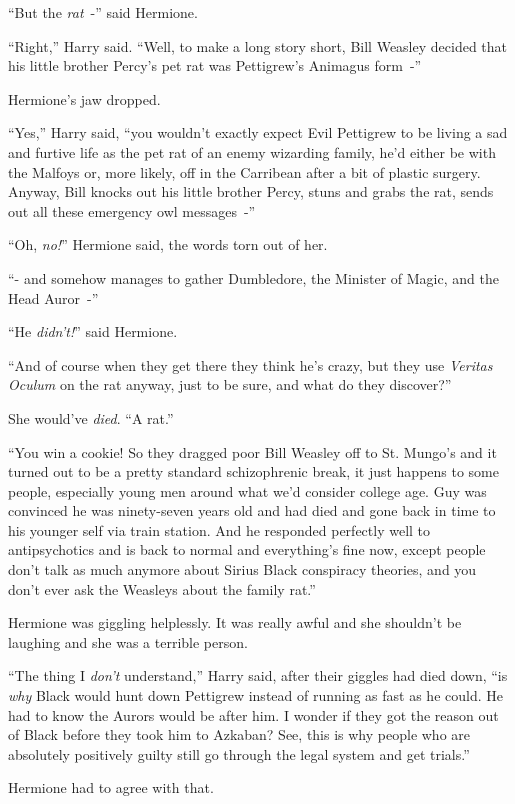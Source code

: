 ``But the \emph{rat}~-'' said Hermione.

``Right,'' Harry said. ``Well, to make a long story short, Bill Weasley decided that his little brother Percy's pet rat was Pettigrew's Animagus form~-''

Hermione's jaw dropped.

``Yes,'' Harry said, ``you wouldn't exactly expect Evil Pettigrew to be living a sad and furtive life as the pet rat of an enemy wizarding family, he'd either be with the Malfoys or, more likely, off in the Carribean after a bit of plastic surgery. Anyway, Bill knocks out his little brother Percy, stuns and grabs the rat, sends out all these emergency owl messages~-''

``Oh, \emph{no!}'' Hermione said, the words torn out of her.

``- and somehow manages to gather Dumbledore, the Minister of Magic, and the Head Auror~-''

``He \emph{didn't!}'' said Hermione.

``And of course when they get there they think he's crazy, but they use \emph{Veritas Oculum} on the rat anyway, just to be sure, and what do they discover?''

She would've \emph{died}. ``A rat.''

``You win a cookie! So they dragged poor Bill Weasley off to St. Mungo's and it turned out to be a pretty standard schizophrenic break, it just happens to some people, especially young men around what we'd consider college age. Guy was convinced he was ninety-seven years old and had died and gone back in time to his younger self via train station. And he responded perfectly well to antipsychotics and is back to normal and everything's fine now, except people don't talk as much anymore about Sirius Black conspiracy theories, and you don't ever ask the Weasleys about the family rat.''

Hermione was giggling helplessly. It was really awful and she shouldn't be laughing and she was a terrible person.

``The thing I \emph{don't} understand,'' Harry said, after their giggles had died down, ``is \emph{why} Black would hunt down Pettigrew instead of running as fast as he could. He had to know the Aurors would be after him. I wonder if they got the reason out of Black before they took him to Azkaban? See, this is why people who are absolutely positively guilty still go through the legal system and get trials.''

Hermione had to agree with that.

